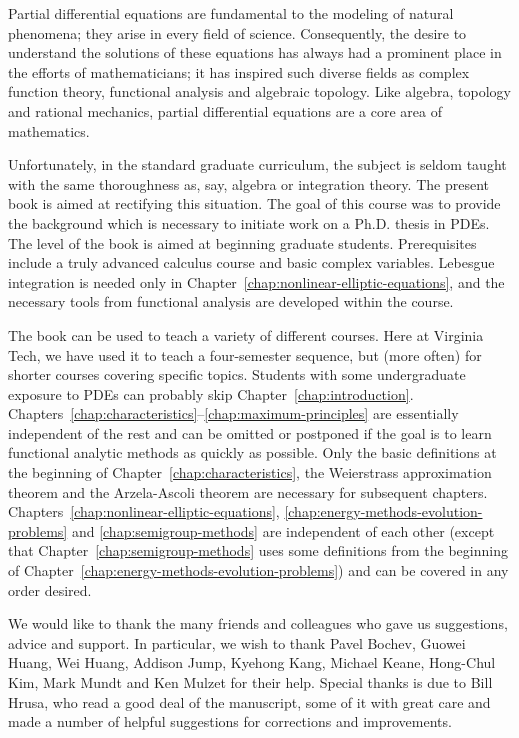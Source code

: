 Partial differential equations are fundamental to the modeling of natural phenomena; they arise in every field of science. Consequently, the desire to understand the solutions of these equations has always had a prominent place in the efforts of mathematicians; it has inspired such diverse fields as complex function theory, functional analysis and algebraic topology. Like algebra, topology and rational mechanics, partial differential equations are a core area of mathematics.

Unfortunately, in the standard graduate curriculum, the subject is seldom taught with the same thoroughness as, say, algebra or integration theory. The present book is aimed at rectifying this situation. The goal of this course was to provide the background which is necessary to initiate work on a Ph.D. thesis in PDEs. The level of the book is aimed at beginning graduate students. Prerequisites include a truly advanced calculus course and basic complex variables. Lebesgue integration is needed only in Chapter~\ref{chap:nonlinear-elliptic-equations}, and the necessary tools from functional analysis are developed within the course.

The book can be used to teach a variety of different courses. Here at Virginia Tech, we have used it to teach a four-semester sequence, but (more often) for shorter courses covering specific topics. Students with some undergraduate exposure to PDEs can probably skip Chapter~\ref{chap:introduction}. Chapters~\ref{chap:characteristics}--\ref{chap:maximum-principles} are essentially independent of the rest and can be omitted or postponed if the goal is to learn functional analytic methods as quickly as possible. Only the basic definitions at the beginning of Chapter~\ref{chap:characteristics}, the Weierstrass approximation theorem and the Arzela-Ascoli theorem are necessary for subsequent chapters. Chapters~\ref{chap:nonlinear-elliptic-equations}, \ref{chap:energy-methods-evolution-problems} and \ref{chap:semigroup-methods} are independent of each other (except that Chapter~\ref{chap:semigroup-methods} uses some definitions from the beginning of Chapter~\ref{chap:energy-methods-evolution-problems}) and can be covered in any order desired.

We would like to thank the many friends and colleagues who gave us suggestions, advice and support. In particular, we wish to thank Pavel Bochev, Guowei Huang, Wei Huang, Addison Jump, Kyehong Kang, Michael Keane, Hong-Chul Kim, Mark Mundt and Ken Mulzet for their help. Special thanks is due to Bill Hrusa, who read a good deal of the manuscript, some of it with great care and made a number of helpful suggestions for corrections and improvements.

